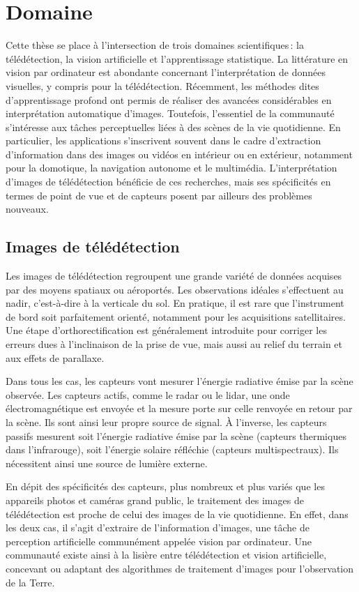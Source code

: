 \section{Domaine}

Cette thèse se place à l'intersection de trois domaines scientifiques\,: la télédétection, la vision artificielle et l'apprentissage statistique. La littérature en vision par ordinateur est abondante concernant l'interprétation de données visuelles, y compris pour la télédétection. Récemment, les méthodes dites d'apprentissage profond ont permis de réaliser des avancées considérables en interprétation automatique d'images. Toutefois, l'essentiel de la communauté s'intéresse aux tâches perceptuelles liées à des scènes de la vie quotidienne. En particulier, les applications s'inscrivent souvent dans le cadre d'extraction d'information dans des images ou vidéos en intérieur ou en extérieur, notamment pour la domotique, la navigation autonome et le multimédia. L'interprétation d'images de télédétection bénéficie de ces recherches, mais ses spécificités en termes de point de vue et de capteurs posent par ailleurs des problèmes nouveaux.

\subsection{Images de télédétection}

Les images de télédétection regroupent une grande variété de données acquises par des moyens spatiaux ou aéroportés. Les observations idéales s'effectuent au nadir, c'est-à-dire à la verticale du sol. En pratique, il est rare que l'instrument de bord soit parfaitement orienté, notamment pour les acquisitions satellitaires. Une étape d'orthorectification est généralement introduite pour corriger les erreurs dues à l'inclinaison de la prise de vue, mais aussi au relief du terrain et aux effets de parallaxe.

Dans tous les cas, les capteurs vont mesurer l'énergie radiative émise par la scène observée. Les capteurs actifs, comme le radar ou le lidar, une onde électromagnétique est envoyée et la mesure porte sur celle renvoyée en retour par la scène. Ils sont ainsi leur propre source de signal. À l'inverse, les capteurs passifs mesurent soit l'énergie radiative émise par la scène (capteurs thermiques dans l'infrarouge), soit l'énergie solaire réfléchie (capteurs multispectraux). Ils nécessitent ainsi une source de lumière externe.

En dépit des spécificités des capteurs, plus nombreux et plus variés que les appareils photos et caméras grand public, le traitement des images de télédétection est proche de celui des images de la vie quotidienne. En effet, dans les deux cas, il s'agit d'extraire de l'information d'images, une tâche de perception artificielle communément appelée vision par ordinateur. Une communauté existe ainsi à la lisière entre télédétection et vision artificielle, concevant ou adaptant des algorithmes de traitement d'images pour l'observation de la Terre.

